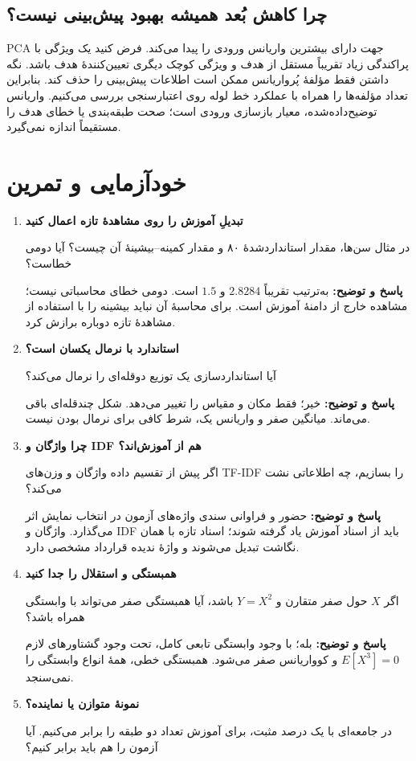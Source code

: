 \documentclass[12pt,a4paper,oneside]{report}
\newcounter{ex}[chapter]
\newenvironment{selftests}{\begin{enumerate}\setlength{\itemsep}{9pt}}{\end{enumerate}}
\newenvironment{selftest}[1]{\item\textbf{#1}\par}{\par}
\newcommand{\answer}[1]{\par{\color{teal}\bfseries پاسخ و توضیح: }#1\par}
\begin{document}
\subsection*{چرا کاهش بُعد همیشه بهبود پیش‌بینی نیست؟}
PCA جهت دارای بیشترین واریانس ورودی را پیدا می‌کند. فرض کنید یک ویژگی با پراکندگی زیاد تقریباً مستقل از هدف و ویژگی کوچک دیگری تعیین‌کنندهٔ هدف باشد. نگه داشتن فقط مؤلفهٔ پُرواریانس ممکن است اطلاعات پیش‌بینی را حذف کند. بنابراین تعداد مؤلفه‌ها را همراه با عملکرد خط لوله روی اعتبارسنجی بررسی می‌کنیم. واریانس توضیح‌داده‌شده، معیار بازسازی ورودی است؛ صحت طبقه‌بندی یا خطای هدف را مستقیماً اندازه نمی‌گیرد.

\section{خودآزمایی و تمرین}
\begin{selftests}
\begin{selftest}{تبدیلِ آموزش را روی مشاهدهٔ تازه اعمال کنید}
در مثال سن‌ها، مقدار استانداردشدهٔ ۸۰ و مقدار کمینه–بیشینهٔ آن چیست؟ آیا دومی خطاست؟
\answer{به‌ترتیب تقریباً $2.8284$ و $1.5$ است. دومی خطای محاسباتی نیست؛ مشاهده خارج از دامنهٔ آموزش است. برای محاسبهٔ آن نباید بیشینه را با استفاده از مشاهدهٔ تازه دوباره برازش کرد.}
\end{selftest}
\begin{selftest}{استاندارد با نرمال یکسان است؟}
آیا استانداردسازی یک توزیع دو‌قله‌ای را نرمال می‌کند؟
\answer{خیر؛ فقط مکان و مقیاس را تغییر می‌دهد. شکل چندقله‌ای باقی می‌ماند. میانگین صفر و واریانس یک، شرط کافی برای نرمال بودن نیست.}
\end{selftest}
\begin{selftest}{چرا واژگان و IDF هم از آموزش‌اند؟}
اگر پیش از تقسیم داده واژگان و وزن‌های TF-IDF را بسازیم، چه اطلاعاتی نشت می‌کند؟
\answer{حضور و فراوانی سندی واژه‌های آزمون در انتخاب نمایش اثر می‌گذارد. واژگان و IDF باید از اسناد آموزش یاد گرفته شوند؛ اسناد تازه با همان نگاشت تبدیل می‌شوند و واژهٔ ندیده قرارداد مشخصی دارد.}
\end{selftest}
\begin{selftest}{همبستگی و استقلال را جدا کنید}
اگر $X$ حول صفر متقارن و $Y=X^2$ باشد، آیا همبستگی صفر می‌تواند با وابستگی همراه باشد؟
\answer{بله؛ با وجود وابستگی تابعی کامل، تحت وجود گشتاورهای لازم $E[X^3]=0$ و کوواریانس صفر می‌شود. همبستگی خطی، همهٔ انواع وابستگی را نمی‌سنجد.}
\end{selftest}
\begin{selftest}{نمونهٔ متوازن یا نماینده؟}
در جامعه‌ای با یک درصد مثبت، برای آموزش تعداد دو طبقه را برابر می‌کنیم. آیا آزمون را هم باید برابر کنیم؟

\end{selftest}
\end{selftests}
\end{document}
